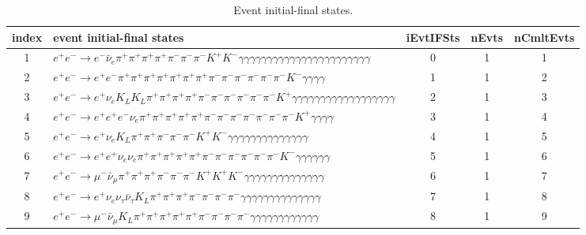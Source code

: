 \documentclass[landscape]{article}
\begin{document}
\begin{table}[htbp!]
\caption{Event initial-final states.}
\small
\centering
\begin{tabular}{|c|>{\centering}p{18cm}|c|c|c|}
\hline
index & event initial-final states & iEvtIFSts & nEvts & nCmltEvts \\
\hline
1 & $ e^{+} e^{-} \rightarrow e^{-} \bar{\nu}_{e} \pi^{+} \pi^{+} \pi^{+} \pi^{+} \pi^{-} \pi^{-} \pi^{-} K^{+} K^{-} \gamma \gamma \gamma \gamma \gamma \gamma \gamma \gamma \gamma \gamma \gamma \gamma \gamma \gamma \gamma \gamma \gamma \gamma \gamma \gamma \gamma \gamma \gamma $ & 0 & 1 & 1 \\
\hline
2 & $ e^{+} e^{-} \rightarrow e^{+} e^{-} \pi^{+} \pi^{+} \pi^{+} \pi^{+} \pi^{+} \pi^{+} \pi^{+} \pi^{-} \pi^{-} \pi^{-} \pi^{-} \pi^{-} \pi^{-} K^{-} \gamma \gamma \gamma \gamma $ & 1 & 1 & 2 \\
\hline
3 & $ e^{+} e^{-} \rightarrow e^{+} \nu_{e} K_{L} K_{L} \pi^{+} \pi^{+} \pi^{+} \pi^{+} \pi^{-} \pi^{-} \pi^{-} \pi^{-} \pi^{-} \pi^{-} K^{+} \gamma \gamma \gamma \gamma \gamma \gamma \gamma \gamma \gamma \gamma \gamma \gamma \gamma \gamma \gamma \gamma \gamma \gamma $ & 2 & 1 & 3 \\
\hline
4 & $ e^{+} e^{-} \rightarrow e^{+} e^{+} e^{-} \nu_{e} \pi^{+} \pi^{+} \pi^{+} \pi^{+} \pi^{+} \pi^{-} \pi^{-} \pi^{-} \pi^{-} \pi^{-} \pi^{-} \pi^{-} K^{+} \gamma \gamma \gamma \gamma $ & 3 & 1 & 4 \\
\hline
5 & $ e^{+} e^{-} \rightarrow e^{+} \nu_{e} K_{L} \pi^{+} \pi^{+} \pi^{-} \pi^{-} \pi^{-} K^{+} K^{-} \gamma \gamma \gamma \gamma \gamma \gamma \gamma \gamma \gamma \gamma \gamma \gamma \gamma \gamma $ & 4 & 1 & 5 \\
\hline
6 & $ e^{+} e^{-} \rightarrow e^{+} e^{+} \nu_{e} \nu_{e} \pi^{+} \pi^{+} \pi^{+} \pi^{+} \pi^{+} \pi^{-} \pi^{-} \pi^{-} \pi^{-} \pi^{-} \pi^{-} K^{-} \gamma \gamma \gamma \gamma \gamma \gamma $ & 5 & 1 & 6 \\
\hline
7 & $ e^{+} e^{-} \rightarrow \mu^{-} \bar{\nu}_{\mu} \pi^{+} \pi^{+} \pi^{+} \pi^{-} \pi^{-} \pi^{-} K^{+} K^{+} K^{-} \gamma \gamma \gamma \gamma \gamma \gamma \gamma \gamma \gamma \gamma \gamma \gamma \gamma \gamma $ & 6 & 1 & 7 \\
\hline
8 & $ e^{+} e^{-} \rightarrow e^{+} \nu_{e} \nu_{\tau} \bar{\nu}_{\tau} K_{L} \pi^{+} \pi^{+} \pi^{+} \pi^{-} \pi^{-} \pi^{-} \pi^{-} \gamma \gamma \gamma \gamma \gamma \gamma \gamma \gamma \gamma \gamma \gamma \gamma \gamma \gamma $ & 7 & 1 & 8 \\
\hline
9 & $ e^{+} e^{-} \rightarrow \mu^{-} \bar{\nu}_{\mu} K_{L} \pi^{+} \pi^{+} \pi^{+} \pi^{+} \pi^{+} \pi^{-} \pi^{-} \pi^{-} \pi^{-} \gamma \gamma \gamma \gamma \gamma \gamma \gamma \gamma \gamma \gamma \gamma \gamma $ & 8 & 1 & 9 \\

\end{tabular}
\end{table}
\end{document}
